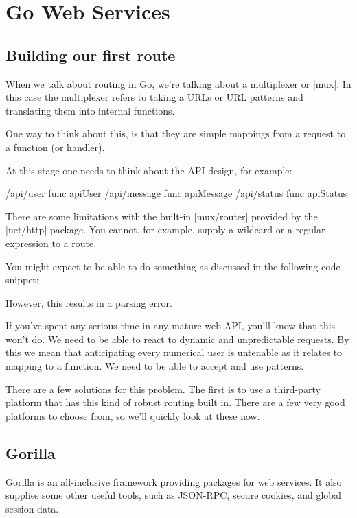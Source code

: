 \chapter{Go Web Services}

\section{Building our first route}

When we talk about routing in Go, we're talking about a multiplexer or |mux|. In this case
the multiplexer refers to taking a URLs or URL patterns and translating them into internal
functions.

One way to think about this, is that they are simple mappings from a request to a function (or handler).

At this stage one needs to think about the API design, for example:

\begin{teX}
/api/user  func apiUser
/api/message  func apiMessage
/api/status  func apiStatus
\end{teX} 

There are some limitations with the built-in |mux/router| provided by the |net/http| package. You cannot, for example, supply a wildcard or a regular expression to a route.

You might expect to be able to do something as discussed in the following code snippet:

However, this results in a parsing error.

If you've spent any serious time in any mature web API, you'll know that this won't do. We need to be able to react to dynamic and unpredictable requests. By this we mean that anticipating every numerical user is untenable as it relates to mapping to a function. We need to be able to accept and use patterns.

There are a few solutions for this problem. The first is to use a third-party platform that has this kind of robust routing built in. There are a few very good platforms to choose from, so we'll quickly look at these now.

\section{Gorilla}

Gorilla is an all-inclusive framework providing packages for web services. It also supplies some
other useful tools, such as JSON-RPC, secure cookies, and global session data.

